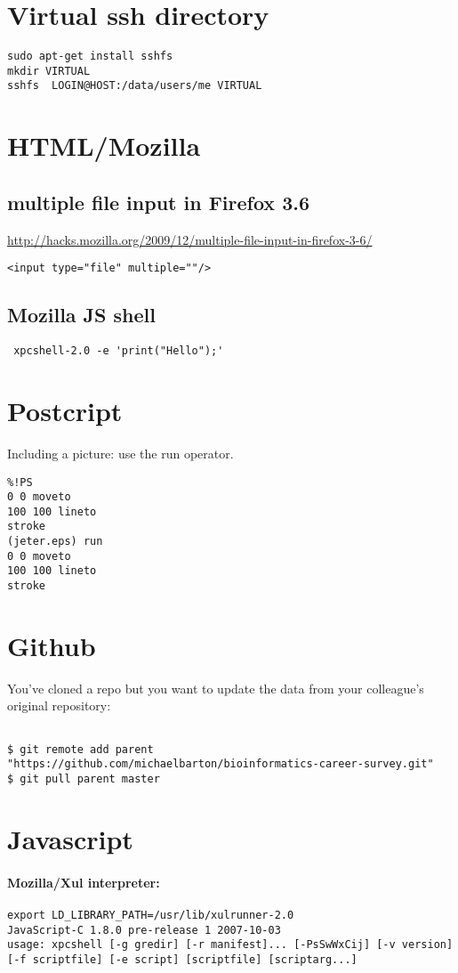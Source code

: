 \documentclass[12pt]{article}
\begin{document}
\section{Virtual ssh directory}
\begin{verbatim}
sudo apt-get install sshfs
mkdir VIRTUAL
sshfs  LOGIN@HOST:/data/users/me VIRTUAL
\end{verbatim}

\section{HTML/Mozilla}
\subsection{multiple file input in Firefox 3.6}
\url{http://hacks.mozilla.org/2009/12/multiple-file-input-in-firefox-3-6/}
\begin{verbatim}
<input type="file" multiple=""/>
\end{verbatim}
\subsection{Mozilla JS shell}
\begin{verbatim}
 xpcshell-2.0 -e 'print("Hello");'
\end{verbatim}
\section{Postcript}
Including a picture: use the run operator.
\begin{verbatim}
%!PS
0 0 moveto
100 100 lineto
stroke
(jeter.eps) run
0 0 moveto
100 100 lineto
stroke
\end{verbatim}
\section{Github}
You've cloned a repo but you want to update the data from your colleague's original repository:
\begin{verbatim}

$ git remote add parent "https://github.com/michaelbarton/bioinformatics-career-survey.git"
$ git pull parent master
\end{verbatim}
\section{Javascript}
\paragraph{Mozilla/Xul interpreter:}
\begin{verbatim}
export LD_LIBRARY_PATH=/usr/lib/xulrunner-2.0
JavaScript-C 1.8.0 pre-release 1 2007-10-03
usage: xpcshell [-g gredir] [-r manifest]... [-PsSwWxCij] [-v version] [-f scriptfile] [-e script] [scriptfile] [scriptarg...]
\end{verbatim}
\end{document}

